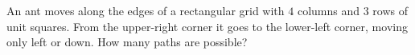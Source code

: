 An ant moves along the edges of a rectangular grid with $4$ columns and $3$ rows of unit squares. From the upper-right corner it goes to the lower-left corner, moving only left or down. How many paths are possible?
